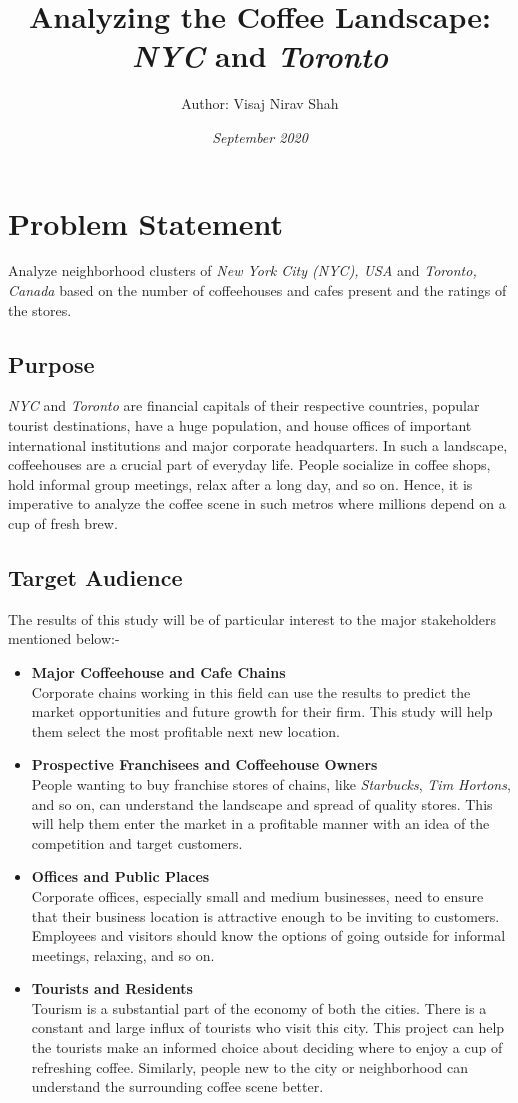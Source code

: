 \documentclass{article}
\title{\textbf{Analyzing the Coffee Landscape: \\\textit{NYC} and \textit{Toronto}}}
\author{Author: Visaj Nirav Shah}
\date{\emph{September 2020}}
\begin{document}
\maketitle

\section{Problem Statement}
{Analyze neighborhood clusters of \textit{New York City (NYC), USA} and \textit{Toronto, Canada} based on the number of coffeehouses and cafes present and the ratings of the stores.}
\subsection{Purpose}
{\textit{NYC} and \textit{Toronto} are financial capitals of their respective countries, popular tourist destinations, have a huge population, and house offices of important international institutions and major corporate headquarters. In such a landscape, coffeehouses are a crucial part of everyday life. People socialize in coffee shops, hold informal group meetings, relax after a long day, and so on. Hence, it is imperative to analyze the coffee scene in such metros where millions depend on a cup of fresh brew.}
\subsection{Target Audience}
{The results of this study will be of particular interest to the major stakeholders mentioned below:-}
\begin{itemize}
    \item \textbf{Major Coffeehouse and Cafe Chains}\\{Corporate chains working in this field can use the results to predict the market opportunities and future growth for their firm. This study will help them select the most profitable next new location.}
    \item \textbf{Prospective Franchisees and Coffeehouse Owners}\\{People wanting to buy franchise stores of chains, like \textit{Starbucks}, \textit{Tim Hortons}, and so on, can understand the landscape and spread of quality stores. This will help them enter the market in a profitable manner with an idea of the competition and target customers.}
    \pagebreak
    \item \textbf{Offices and Public Places}\\{Corporate offices, especially small and medium businesses, need to ensure that their business location is attractive enough to be inviting to customers. Employees and visitors should know the options of going outside for informal meetings, relaxing, and so on.}
    \item \textbf{Tourists and Residents}\\{Tourism is a substantial part of the economy of both the cities. There is a constant and large influx of tourists who visit this city. This project can help the tourists make an informed choice about deciding where to enjoy a cup of refreshing coffee. Similarly, people new to the city or neighborhood can understand the surrounding coffee scene better.}
\end{itemize}
\end{document}
